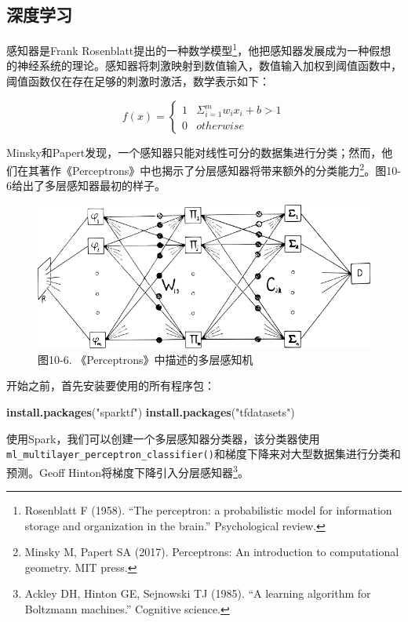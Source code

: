 \documentclass[
]{article}
\newenvironment{Shaded}{\begin{snugshade}}{\end{snugshade}}
\newcommand{\KeywordTok}[1]{\textcolor[rgb]{0.13,0.29,0.53}{\textbf{#1}}}
\newcommand{\NormalTok}[1]{#1}
\newcommand{\StringTok}[1]{\textcolor[rgb]{0.31,0.60,0.02}{#1}}
\begin{document}
\hypertarget{ux6df1ux5ea6ux5b66ux4e60}{%
\subsection{深度学习}\label{ux6df1ux5ea6ux5b66ux4e60}}

感知器是Frank Rosenblatt提出的一种数学模型\footnote{Rosenblatt F (1958).
  ``The perceptron: a probabilistic model for information storage and
  organization in the brain.'' Psychological review.}，他把感知器发展成为一种假想的神经系统的理论。感知器将刺激映射到数值输入，数值输入加权到阈值函数中，阈值函数仅在存在足够的刺激时激活，数学表示如下：

\[
f(x) =
\begin{cases}
1 & \Sigma^m _{i=1} w_ix_i+b \gt 1 \\
0 & otherwise
\end{cases}
\]

Minsky和Papert发现，一个感知器只能对线性可分的数据集进行分类；然而，他们在其著作《Perceptrons》中也揭示了分层感知器将带来额外的分类能力\footnote{Minsky
  M, Papert SA (2017). Perceptrons: An introduction to computational
  geometry. MIT press.}。图10-6给出了多层感知器最初的样子。

\begin{figure}
\centering
\includegraphics{figures/10_6.png}
\caption{图10-6. 《Perceptrons》中描述的多层感知机}
\end{figure}

开始之前，首先安装要使用的所有程序包：

\begin{Shaded}
\begin{Highlighting}[]
\KeywordTok{install.packages}\NormalTok{(}\StringTok{"sparktf"}\NormalTok{)}
\KeywordTok{install.packages}\NormalTok{(}\StringTok{"tfdatasets"}\NormalTok{)}
\end{Highlighting}
\end{Shaded}

使用Spark，我们可以创建一个多层感知器分类器，该分类器使用\texttt{ml\_multilayer\_perceptron\_classifier()}和梯度下降来对大型数据集进行分类和预测。Geoff
Hinton将梯度下降引入分层感知器\footnote{Ackley DH, Hinton GE, Sejnowski
  TJ (1985). ``A learning algorithm for Boltzmann machines.'' Cognitive
  science.}。
\end{document}
